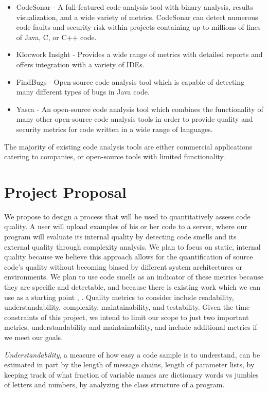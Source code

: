 \documentclass{sig-alternate}
\begin{document}
\begin{itemize}
\item CodeSonar - A full-featured code analysis tool with binary analysis, results visualization, and a wide variety of metrics. CodeSonar can detect numerous code faults and security risk within projects containing up to millions of lines of Java, C, or C++ code.
\item Klocwork Insight - Provides a wide range of metrics with detailed reports and offers integration with a variety of IDEs.
\item FindBugs - Open-source code analysis tool which is capable of detecting many different types of bugs in Java code.
\item Yasca - An open-source code analysis tool which combines the functionality of many other open-source code analysis tools in order to provide quality and security metrics for code written in a wide range of languages.
\end{itemize}

The majority of existing code analysis tools are either commercial applications catering to companies, or open-source tools with limited functionality.

\section{Project Proposal}
\label{sec:project_proposal}
We propose to design a process that will be used to quantitatively assess code quality. A user will upload examples of his or her code to a server, where our program will evaluate its internal quality by detecting code smells and its external quality through complexity analysis. We plan to focus on static, internal quality because we believe this approach allows for the quantification of source code's quality without becoming biased by different system architectures or environments. We plan to use code smells as an indicator of these metrics because they are specific and detectable, and because there is existing work which we can use as a starting point \cite{moha2009duchien}, \cite{palomba}. Quality metrics to consider include readability, understandability, complexity, maintainability, and testability. Given the time constraints of this project, we intend to limit our scope to just two important metrics, understandability and maintainability, and include additional metrics if we meet our goals. 

{\it Understandability}, a measure of how easy a code sample is to understand, can be estimated in part by the length of message chains, length of parameter lists, by keeping track of what fraction of variable names are dictionary words vs jumbles of letters and numbers, by analyzing the class structure of a program. 
\end{document}
